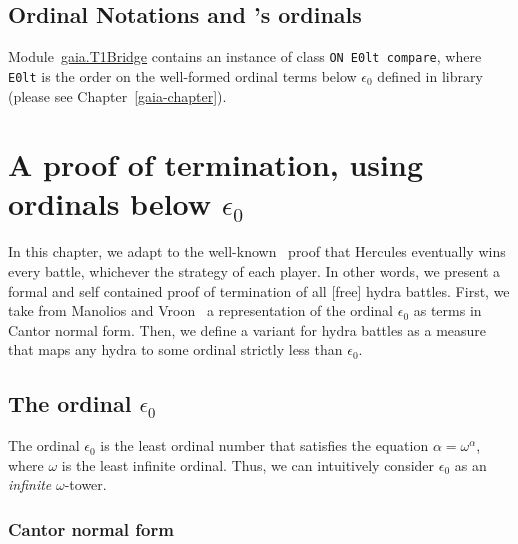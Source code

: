 \section{Ordinal Notations and \gaia's ordinals}
\gaiasign Module~\href{../theories/html/gaia.T1Bridge.html}{gaia.T1Bridge} contains an instance of class \texttt{ON E0lt compare}, where \texttt{E0lt} is the order on the well-formed ordinal terms below $\epsilon_0$ defined in \gaiaHydras library (please see Chapter~\ref{gaia-chapter}).









\chapter[A proof of termination, using epsilon0]{A proof of termination, using ordinals below \texorpdfstring{$\epsilon_0$}{Epsilon0}}

\label{cnf-math-def}
\label{chap:T1}

In this chapter, we adapt to \coq{} the well-known~\cite{KP82}  proof that Hercules eventually wins every battle, whichever the strategy  of each player.
In other words, we present  a formal and self contained proof of termination  of all [free] hydra battles.
First, we take from Manolios and Vroon~\cite{Manolios2005} a representation of the ordinal $\epsilon_0$ as terms in Cantor normal form. Then, we define a variant for hydra battles as a measure that maps any hydra to some ordinal strictly less than $\epsilon_0$.



\section{The ordinal \texorpdfstring{\(\epsilon_0\)}{epsilon0}}
\label{sec:epsilon0-intro}

The ordinal \(\epsilon_0\) is the least ordinal number that satisfies 
the equation \(\alpha = \omega^\alpha\), where \(\omega\) is 
the least infinite ordinal.
Thus, we can intuitively consider \(\epsilon_0\) as an
\emph{infinite} \(\omega\)-tower.


\subsection{Cantor normal form}



